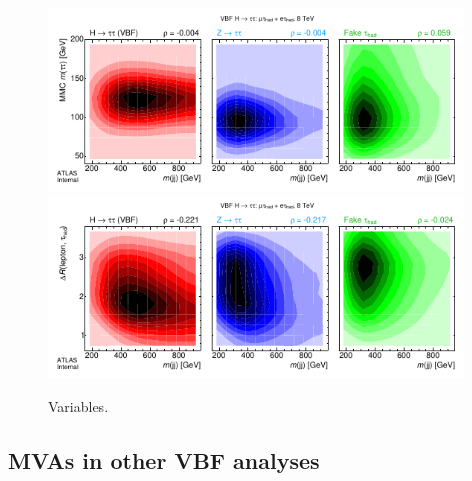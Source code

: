 \begin{figure}[tp]
  \centering
  \includegraphics[width=0.98\textwidth]{figures/kinematiccorrelations/jj_mass-vs-mMMC}
  \includegraphics[width=0.98\textwidth]{figures/kinematiccorrelations/jj_mass-vs-taulep_dR}
  \caption{Variables.}
  \label{fig:strategy-kinematic-correlations-4}
\end{figure}

\subsection{MVAs in other VBF analyses}
\label{sec:strategy-mva-elsewhere}

